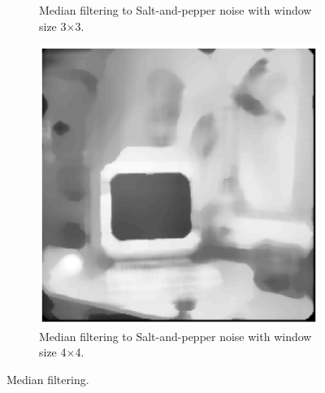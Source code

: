 \documentclass[11pt,a4paper]{article}
\begin{document}
\begin{itemize}
\begin{figure}[!ht]
\begin{subfigure}[t]{.32\linewidth}
			\caption{\scriptsize Median filtering to Salt-and-pepper noise with window size 3$\times$3.}
			\label{fig:medToSap3*3}
		\end{subfigure}
		\begin{subfigure}[t]{.32\linewidth} %
			\includegraphics[width=\columnwidth]{Q17_Med_to_Sap_4_4.eps}
			\caption{\scriptsize Median filtering to Salt-and-pepper noise with window size 4$\times$4.}
			\label{fig:medToSap4*4}
		\end{subfigure}

		\caption{Median filtering.}
		\label{fig:med}
	\end{figure}	


\end{itemize}
\end{document}
